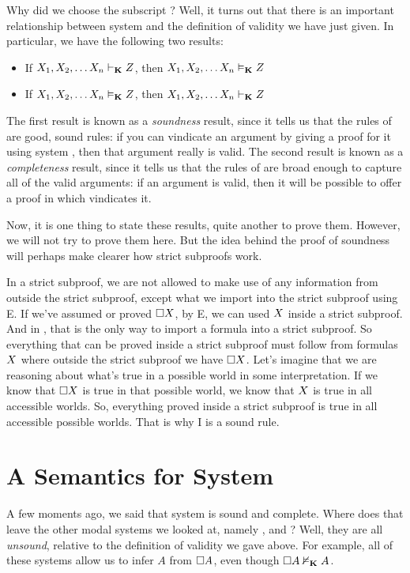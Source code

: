 Why did we choose the subscript \mlK? Well, it turns out that there is an important relationship between system \mlK{} and the definition of validity we have just given. In particular, we have the following two results:
\begin{itemize}
	\item If $X_1,X_2, \dots X_n\vdash_{\mathbf{K}}Z$, then $X_1,X_2, \dots X_n\vDash_{\mathbf{K}}Z$
	\item If $X_1,X_2, \dots X_n\vDash_{\mathbf{K}}Z$, then $X_1,X_2, \dots X_n\vdash_{\mathbf{K}}Z$
\end{itemize}
The first result is known as a \emph{soundness} result, since it tells us that the rules of \mlK{} are good, sound rules: if you can vindicate an argument by giving a proof for it using system \mlK, then that argument really is valid. The second result is known as a \emph{completeness} result, since it tells us that the rules of \mlK{} are broad enough to capture all of the valid arguments: if an argument is valid, then it will be possible to offer a proof in \mlK{} which vindicates it.

Now, it is one thing to state these results, quite another to prove them. However, we will not try to prove them here. But the idea behind the proof of soundness will perhaps make clearer how strict subproofs work. 

In a strict subproof, we are not allowed to make use of any information from outside the strict subproof, except what we import into the strict subproof using \ebox E. If we've assumed or proved $\Box X$, by \ebox E, we can used $X$ inside a strict subproof. And in \mlK, that is the only way to import a formula into a strict subproof. So everything that can be proved inside a strict subproof must follow from formulas $X$ where outside the strict subproof we have $\Box X$. Let's imagine that we are reasoning about what's true in a possible world in some interpretation. If we know that $\Box X$ is true in that possible world, we know that $X$ is true in all accessible worlds. So, everything proved inside a strict subproof is true in all accessible possible worlds. That is why \ebox I is a sound rule.

\section{A Semantics for System \mlT}
\label{SemanticsT}

A few moments ago, we said that system \mlK{} is sound and complete. Where does that leave the other modal systems we looked at, namely  \mlT, \mlSfour{} and \mlSfive? Well, they are all \emph{unsound}, relative to the definition of validity we gave above. For example, all of these systems allow us to infer $A$ from $\Box A$, even though $\Box A\nvDash_{\mathbf{K}} A$.

